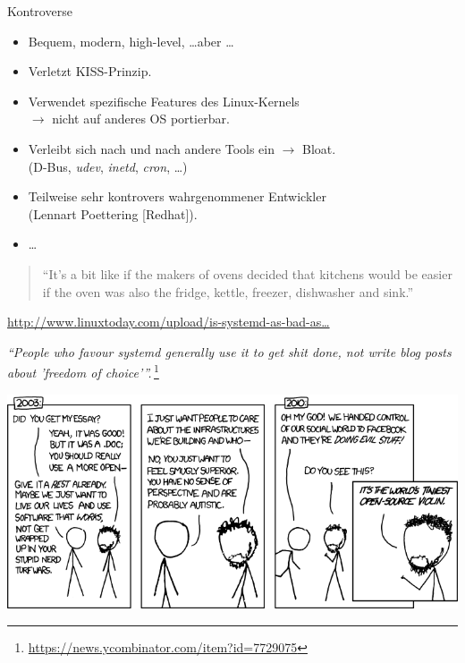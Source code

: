 \begin{frame}{Kontroverse}
\begin{itemize}
\item Bequem, modern, high-level, \dots aber \dots
\item Verletzt KISS-Prinzip.
\item Verwendet spezifische Features des Linux-Kernels\\ $\rightarrow$
nicht auf anderes OS portierbar.
\item Verleibt sich nach und nach andere Tools ein $\rightarrow$
Bloat.\\ (D-Bus, \emph{udev}, \emph{inetd}, \emph{cron}, \dots)
\item Teilweise sehr kontrovers wahrgenommener Entwickler\\ (Lennart
Poettering [Redhat]).
\item \dots
\end{itemize}

\begin{quote}
``It's a bit like if the makers of ovens decided that kitchens would be
easier if the oven was also the fridge, kettle, freezer, dishwasher and
sink.''
\end{quote}
\hfill{\footnotesize\href{http://www.linuxtoday.com/upload/is-systemd-as-bad-as-boycott-systemd-is-trying-to-make-it-140903095011.html}{http://www.linuxtoday.com/upload/is-systemd-as-bad-as\dots}}
\end{frame}

\begin{frame}[plain]
\emph{``People who favour systemd generally use it to get shit done, not
write blog posts about 'freedom of
choice'{}''.}\,\footnote{\url{https://news.ycombinator.com/item?id=7729075}}

\includegraphics[width=\textwidth]{files/xkcd743-infrastructures.png}
\end{frame}

